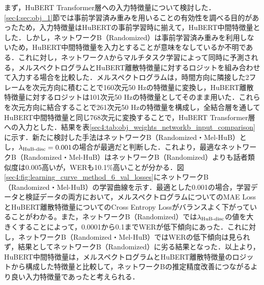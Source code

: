 まず，HuBERT Transformer層への入力特徴量について検討した．\ref{sec4:sec:obj_1}節では事前学習済み重みを用いることの有効性を調べる目的があったため，入力特徴量はHuBERTの事前学習時に揃えて，HuBERT中間特徴量とした．しかし，ネットワークB（Randomized）は事前学習済み重みを利用しないため，HuBERT中間特徴量を入力とすることが意味をなしているか不明である．これに対し，ネットワークAからマルチタスク学習によって同時に予測される，メルスペクトログラムとHuBERT離散特徴量に対するロジットを組み合わせて入力する場合を比較した．メルスペクトログラムは，時間方向に隣接した2フレームを次元方向に積むことで160次元50 Hzの特徴量に変換し，HuBERT離散特徴量に対するロジットは101次元50 Hzの特徴量としてそのまま用いた．これらを次元方向に結合することで261次元50 Hzの特徴量を構成し，全結合層を通してHuBERT中間特徴量と同じ768次元に変換することで，HuBERT Transformer層への入力とした．結果を表\ref{sec4:tab:obj_weights_networkb_input_comparison}に示す．新たに検討した手法はネットワークB（Randomized・Mel-HuB）とし，$\lambda_{\text{HuB-disc}} = 0.001$の場合が最適だと判断した．これより，最適なネットワークB（Randomized・Mel-HuB）はネットワークB（Randomized）よりも話者類似度は0.005高いが，WERも10.1\%高いことが分かる．図\ref{sec4:fig:learning_curve_method_6_val_losses}にネットワークB（Randomized・Mel-HuB）の学習曲線を示す．最適とした0.001の場合，学習データと検証データの両方において，メルスペクトログラムについてのMAE LossとHuBERT離散特徴量についてのCross Entropy Lossがバランスよく下がっていることがわかる。また，ネットワークB（Randomized）では$\lambda_{\text{HuB-disc}}$の値を大きくすることによって，0.0001から0.1までWERが低下傾向にあった．これに対し，ネットワークB（Randomized・Mel-HuB）ではWERの低下傾向は見られず，結果としてネットワークB（Randomized）に劣る結果となった．以上より，HuBERT中間特徴量は，メルスペクトログラムとHuBERT離散特徴量のロジットから構成した特徴量と比較して，ネットワークBの推定精度改善につながるより良い入力特徴量であったと考えられる．


